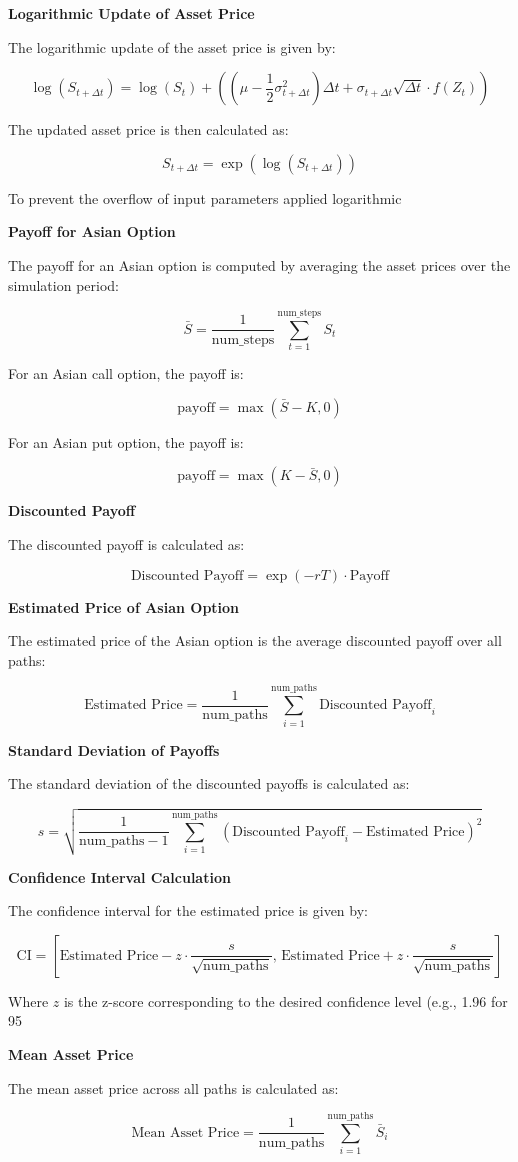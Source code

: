 \documentclass{article}
\begin{document}
\textbf{Logarithmic Update of Asset Price}

The logarithmic update of the asset price is given by:

\[
\log(S_{t + \Delta t}) = \log(S_t) + \left( \left( \mu - \frac{1}{2} \sigma_{t + \Delta t}^2 \right) \Delta t + \sigma_{t + \Delta t} \sqrt{\Delta t} \cdot f(Z_t) \right)
\]

The updated asset price is then calculated as:

\[
S_{t + \Delta t} = \exp\left( \log(S_{t + \Delta t}) \right)
\]

To prevent the overflow of input parameters applied logarithmic 

\textbf{Payoff for Asian Option}

The payoff for an Asian option is computed by averaging the asset prices over the simulation period:

\[
\bar{S} = \frac{1}{\text{num\_steps}} \sum_{t=1}^{\text{num\_steps}} S_t
\]

For an Asian call option, the payoff is:

\[
\text{payoff} = \max(\bar{S} - K, 0)
\]

For an Asian put option, the payoff is:

\[
\text{payoff} = \max(K - \bar{S}, 0)
\]

\textbf{Discounted Payoff}

The discounted payoff is calculated as:

\[
\text{Discounted Payoff} = \exp(-rT) \cdot \text{Payoff}
\]

\textbf{Estimated Price of Asian Option}

The estimated price of the Asian option is the average discounted payoff over all paths:

\[
\text{Estimated Price} = \frac{1}{\text{num\_paths}} \sum_{i=1}^{\text{num\_paths}} \text{Discounted Payoff}_i
\]

\textbf{Standard Deviation of Payoffs}

The standard deviation of the discounted payoffs is calculated as:

\[
s = \sqrt{\frac{1}{\text{num\_paths} - 1} \sum_{i=1}^{\text{num\_paths}} \left( \text{Discounted Payoff}_i - \text{Estimated Price} \right)^2}
\]

\textbf{Confidence Interval Calculation}

The confidence interval for the estimated price is given by:

\[
\text{CI} = \left[ \text{Estimated Price} - z \cdot \frac{s}{\sqrt{\text{num\_paths}}}, \, \text{Estimated Price} + z \cdot \frac{s}{\sqrt{\text{num\_paths}}} \right]
\]

Where \( z \) is the z-score corresponding to the desired confidence level (e.g., 1.96 for 95%

\textbf{Mean Asset Price}

The mean asset price across all paths is calculated as:

\[
\text{Mean Asset Price} = \frac{1}{\text{num\_paths}} \sum_{i=1}^{\text{num\_paths}} \bar{S}_i
\]
\end{document}
